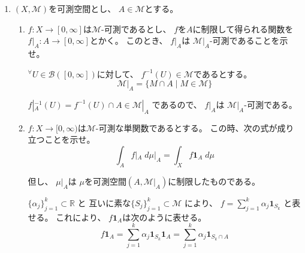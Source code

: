 \documentclass[12pt,b5paper]{ltjsarticle}
\begin{document}
\hrulefill

\begin{enumerate}
 \item
      $(X,\mathcal{M})$を可測空間とし、
      $A\in\mathcal{M}$とする。

      \begin{enumerate}
       \item
            $f:X \to [0,\infty]$は$\mathcal{M}$-可測であるとし、
            $f$を$A$に制限して得られる関数を
            $f|_{A}:A \to [0,\infty]$とかく。
            このとき、
            $f|_{A}$は
            $\mathcal{M}|_{A}$-可測であることを示せ。

            \dotfill

            ${}^{\forall}U\in \mathcal{B}([0,\infty])$に対して、
            $f^{-1}(U)\in\mathcal{M}$であるとする。
            \begin{equation}
             \mathcal{M}|_{A} = \{ M\cap A \mid M\in\mathcal{M} \}
            \end{equation}

            $f|_{A}^{-1}(U) = f^{-1}(U)\cap A \in \mathcal{M}|_{A}$
            であるので、
            $f|_{A}$は
            $\mathcal{M}|_{A}$-可測である。

            \hrulefill

       \item
            $f:X \to [0,\infty)$は$\mathcal{M}$-可測な単関数であるとする。
            この時、次の式が成り立つことを示せ。
            \begin{equation}
             \int_{A} f|_{A}\;d\mu|_{A} = \int_{X} f\mathbf{1}_{A} \;d\mu
            \end{equation}

            但し、
            $\mu|_{A}$は
            $\mu$を可測空間$(A,\mathcal{M}|_{A})$に制限したものである。

            \dotfill

            
            $\{\alpha_{j}\}_{j=1}^{k} \subset \mathbb{R}$
            と
            互いに素な$\{S_{j}\}_{j=1}^{k} \subset \mathcal{M}$
            により、
            $f=\sum_{j=1}^{k}\alpha_{j}\mathbf{1}_{S_{k}}$
            と表せる。
            これにより、
            $f\mathbf{1}_{A}$は次のように表せる。
            \begin{equation}
             f\mathbf{1}_{A}
              =\sum_{j=1}^{k}\alpha_{j}\mathbf{1}_{S_{k}}\mathbf{1}_{A}
              =\sum_{j=1}^{k}\alpha_{j}\mathbf{1}_{S_{k} \cap A}
            \end{equation}


\end{enumerate}
\end{enumerate}
\end{document}
